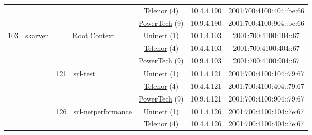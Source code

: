 \begin{small}
\begin{center}
\begin{longtable}{|c|c|c|c|c|c|c|c|}
  &  &  &  & \multicolumn{2}{|c|}{\tiny{\href{https://www.telenor.no}{Telenor} (4)}} & \tiny{10.4.4.190} & \tiny{2001:700:4100:404::be:66} \\* \cline{5-5}\cline{6-6}\cline{7-7}\cline{8-8}
  &  &  &  & \multicolumn{2}{|c|}{\tiny{\href{http://www.powertech.no}{PowerTech} (9)}} & \tiny{10.9.4.190} & \tiny{2001:700:4100:904::be:66} \\ \hline
 \multirow{51}{*}{\tiny{103}} & \multicolumn{1}{|l|}{\multirow{51}{*}{\tiny{skarven}}} & \multicolumn{2}{|c|}{\multirow{3}{*}{\tiny{Root Context}}} & \multicolumn{2}{|c|}{\tiny{\href{https://www.uninett.no}{Uninett} (1)}} & \tiny{10.1.4.103} & \tiny{2001:700:4100:104::67} \\* \cline{5-5}\cline{6-6}\cline{7-7}\cline{8-8}
  &  & \multicolumn{2}{|c|}{} & \multicolumn{2}{|c|}{\tiny{\href{https://www.telenor.no}{Telenor} (4)}} & \tiny{10.4.4.103} & \tiny{2001:700:4100:404::67} \\* \cline{5-5}\cline{6-6}\cline{7-7}\cline{8-8}
  &  & \multicolumn{2}{|c|}{} & \multicolumn{2}{|c|}{\tiny{\href{http://www.powertech.no}{PowerTech} (9)}} & \tiny{10.9.4.103} & \tiny{2001:700:4100:904::67} \\* \cline{3-3}\cline{4-4}\cline{5-5}\cline{6-6}\cline{7-7}\cline{8-8}
  &  & \multirow{3}{*}{\tiny{121}} & \multicolumn{1}{|l|}{\multirow{3}{*}{\tiny{srl-test}}} & \multicolumn{2}{|c|}{\tiny{\href{https://www.uninett.no}{Uninett} (1)}} & \tiny{10.1.4.121} & \tiny{2001:700:4100:104::79:67} \\* \cline{5-5}\cline{6-6}\cline{7-7}\cline{8-8}
  &  &  &  & \multicolumn{2}{|c|}{\tiny{\href{https://www.telenor.no}{Telenor} (4)}} & \tiny{10.4.4.121} & \tiny{2001:700:4100:404::79:67} \\* \cline{5-5}\cline{6-6}\cline{7-7}\cline{8-8}
  &  &  &  & \multicolumn{2}{|c|}{\tiny{\href{http://www.powertech.no}{PowerTech} (9)}} & \tiny{10.9.4.121} & \tiny{2001:700:4100:904::79:67} \\* \cline{3-3}\cline{4-4}\cline{5-5}\cline{6-6}\cline{7-7}\cline{8-8}
  &  & \multirow{3}{*}{\tiny{126}} & \multicolumn{1}{|l|}{\multirow{3}{*}{\tiny{srl-netperformance}}} & \multicolumn{2}{|c|}{\tiny{\href{https://www.uninett.no}{Uninett} (1)}} & \tiny{10.1.4.126} & \tiny{2001:700:4100:104::7e:67} \\* \cline{5-5}\cline{6-6}\cline{7-7}\cline{8-8}
  &  &  &  & \multicolumn{2}{|c|}{\tiny{\href{https://www.telenor.no}{Telenor} (4)}} & \tiny{10.4.4.126} & \tiny{2001:700:4100:404::7e:67} \\* \cline{5-5}\cline{6-6}\cline{7-7}\cline{8-8}

\end{longtable}
\end{center}
\end{small}
